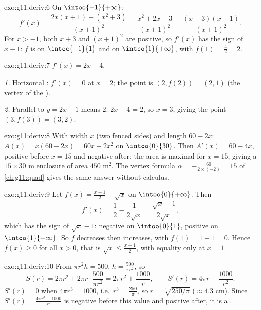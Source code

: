 \begin{solution}{exo:g11:deriv:6}
On $\intoo{-1}{+\infty}$:
\[
f'(x) = \frac{2x(x+1) - (x^2+3)}{(x+1)^2}
= \frac{x^2 + 2x - 3}{(x+1)^2}
= \frac{(x+3)(x-1)}{(x+1)^2}.
\]
For $x > -1$, both $x + 3$ and $(x+1)^2$ are positive, so $f'(x)$ has the
sign of $x - 1$: $f$ is  on $\intoc{-1}{1}$ and  on
$\intco{1}{+\infty}$, with  $f(1) = \frac{4}{2} = 2$.
\end{solution}

\begin{solution}{exo:g11:deriv:7}
$f'(x) = 2x - 4$.

\emph{1.} Horizontal : $f'(x) = 0$ at $x = 2$; the point is
$(2, f(2)) = (2, 1)$ (the vertex of the ).

\emph{2.} Parallel to $y = 2x + 1$ means  $2$: $2x - 4 = 2$, so
$x = 3$, giving the point $(3, f(3)) = (3, 2)$.
\end{solution}

\begin{solution}{exo:g11:deriv:8}
With width $x$ (two fenced sides) and length $60 - 2x$:
$A(x) = x(60 - 2x) = 60x - 2x^2$ on $\intoo{0}{30}$. Then
$A'(x) = 60 - 4x$, positive before $x = 15$ and negative after: the area
is maximal for $x = 15$, giving a $15 \times 30$ m enclosure of area
$450$ m$^2$. The vertex formula $\alpha = -\frac{60}{2 \times (-2)} = 15$
of \cref{ch:g11:quad} gives the same answer without calculus.
\end{solution}

\begin{solution}{exo:g11:deriv:9}
Let $f(x) = \frac{x+1}{2} - \sqrt x$ on $\intoo{0}{+\infty}$. Then
\[
f'(x) = \frac12 - \frac{1}{2\sqrt x} = \frac{\sqrt x - 1}{2\sqrt x},
\]
which has the sign of $\sqrt x - 1$: negative on $\intoo{0}{1}$, positive
on $\intoo{1}{+\infty}$. So $f$ decreases then increases, with 
$f(1) = 1 - 1 = 0$. Hence $f(x) \geq 0$ for all $x > 0$, that is
$\sqrt x \leq \frac{x+1}{2}$, with equality only at $x = 1$.
\end{solution}

\begin{solution}{exo:g11:deriv:10}
From $\pi r^2 h = 500$, $h = \frac{500}{\pi r^2}$, so
\[
S(r) = 2\pi r^2 + 2\pi r \cdot \frac{500}{\pi r^2}
= 2\pi r^2 + \frac{1000}{r},
\qquad
S'(r) = 4\pi r - \frac{1000}{r^2}.
\]
$S'(r) = 0$ when $4\pi r^3 = 1000$, i.e.\ $r^3 = \frac{250}{\pi}$, so
$r = \sqrt[3]{250/\pi}$ ($\approx 4.3$ cm). Since $S'(r) =
\frac{4\pi r^3 - 1000}{r^2}$ is negative before this value and positive
after, it is a .
\end{solution}

